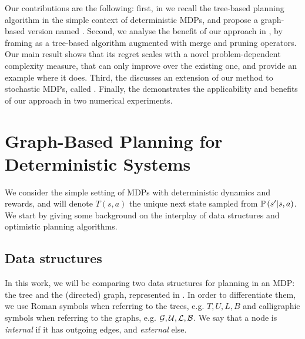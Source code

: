 \documentclass[runningheads]{llncs}
\begin{document}
Our contributions are the following: first, in  we recall the \OPD tree-based planning algorithm in the simple context of deterministic MDPs, and propose a graph-based version named \GBOPD. Second, we analyse the benefit of our approach in , by framing \GBOP as a tree-based algorithm augmented with merge and pruning operators. Our main result shows that its regret scales with a novel problem-dependent complexity measure, that can only improve over the existing one, and provide an example where it does. Third, the  discusses an extension of our method to stochastic MDPs, called \GBOP. Finally, the  demonstrates the applicability and benefits of our approach in two numerical experiments.

\section{Graph-Based Planning for Deterministic Systems}
\label{sec:gbopd}

We consider the simple setting of MDPs with deterministic dynamics and rewards, and will denote $T(s,a)$ the unique next state sampled from $\mathbb{P}\left(s'|s,a\right)$.
We start by giving some background on the interplay of data structures and optimistic planning algorithms.

\subsection{Data structures}

In this work, we will be comparing two data structures for planning in an MDP: the tree and the (directed) graph, represented in . In order to differentiate them, we use Roman symbols when referring to the trees, e.g. $T, U, L, B$ and calligraphic symbols when referring to the graphs, e.g. $\mathcal{G}, \mathcal{U}, \mathcal{L}, \mathcal{B}$. We say that a node is \emph{internal} if it has outgoing edges, and \emph{external} else.
\end{document}

